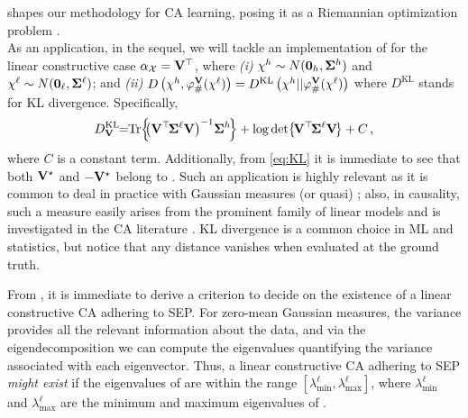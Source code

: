  shapes our methodology for CA learning, posing it as a Riemannian optimization problem \cite{boumal2023introduction}.\\
As an application, in the sequel, we will tackle an implementation of  for the linear constructive case $\alpha_{\mathcal{X}}=\mathbf{V}^\top$, where \emph{(i)} $\chi^{h} \sim N(\boldsymbol{0}_h, \boldsymbol{\Sigma}^{h})$ and $\chi^{\ell} \sim N(\boldsymbol{0}_\ell, \boldsymbol{\Sigma}^{\ell})$; and \emph{(ii)} $D\left(\chi^{h},\varphi_{\#}^{\mathbf{V}}(\chi^{\ell})\right)=D^{\mathrm{KL}}\left(\chi^{h} || \varphi_{\#}^{\mathbf{V}}(\chi^{\ell})\right)$ where $D^{\mathrm{KL}}$ stands for KL divergence.
Specifically, %
\begin{equation}\label{eq:KL}
        \KL{\V}\!\!=\!\!\Tr{\!\!\left( \V^\top \! \covlow \V\right)^{-1} \!\covhigh \!} + \log\det{\! \V^\top \! \covlow \V \! } + C\,,
\end{equation}
where $C$ is a constant term.
Additionally, from \cref{eq:KL} it is immediate to see that both $\mathbf{V}^\star$ and $-\mathbf{V}^\star$ belong to \myker \KL{\V}.
Such an application is highly relevant as it is common to deal in practice with Gaussian measures (or quasi) \cite{gabriele2024extracting}; also, in causality, such a measure easily arises from the prominent family of linear models \cite{bollen1989structural,shimizu2006linear} and is investigated in the CA literature \cite{kekic2023targeted,massidda2024learningcausalabstractionslinear}.
KL divergence is a common choice in ML and statistics, but notice that any distance vanishes when evaluated at the ground truth.

\begin{remark}\label{reamrk:poss_existence}
    From , it is immediate to derive a criterion to decide on the existence of a linear constructive CA adhering to SEP. For zero-mean Gaussian measures, the variance provides all the relevant information about the data, and via the eigendecomposition we can compute the eigenvalues quantifying the variance associated with each eigenvector. Thus, a linear constructive CA adhering to SEP \emph{might exist} if the eigenvalues of \covhigh are within the range $[\lambda_{\mathrm{min}}^\ell, \lambda_{\mathrm{max}}^\ell]$, where $\lambda_{\mathrm{min}}^\ell$ and $\lambda_{\mathrm{max}}^\ell$ are the minimum and maximum eigenvalues of \covlow.
\end{remark}

